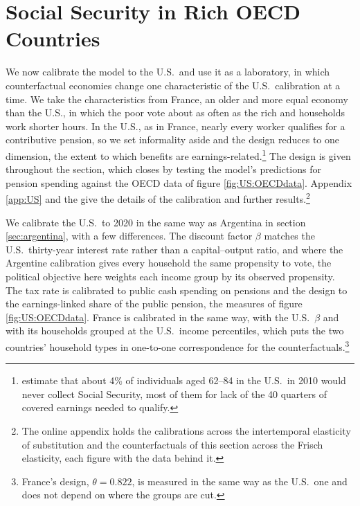 \section{Social Security in Rich OECD Countries}\label{sec:oecd}\label{sec:quant:OECD}
We now calibrate the model to the U.S.\ and use it as a laboratory, in which counterfactual economies change one characteristic of the U.S.\ calibration at a time. We take the characteristics from France, an older and more equal economy than the U.S., in which the poor vote about as often as the rich and households work shorter hours. In the U.S., as in France, nearly every worker qualifies for a contributive pension, so we set informality aside and the design reduces to one dimension, the extent to which benefits are earnings-related.\footnote{\textcite{WhitmanRa1} estimate that about 4\% of individuals aged 62--84 in the U.S.\ in 2010 would never collect Social Security, most of them for lack of the 40 quarters of covered earnings needed to qualify.} The design is given throughout the section, which closes by testing the model's predictions for pension spending against the OECD data of figure \ref{fig:US:OECDdata}. Appendix \ref{app:US} and the  give the details of the calibration and further results.\footnote{The online appendix holds the calibrations across the intertemporal elasticity of substitution and the counterfactuals of this section across the Frisch elasticity, each figure with the data behind it.}


We calibrate the U.S.\ to 2020 in the same way as Argentina in section \ref{sec:argentina}, with a few differences. The discount factor $\beta$ matches the U.S.\ thirty-year interest rate rather than a capital--output ratio, and where the Argentine calibration gives every household the same propensity to vote, the political objective here weights each income group by its observed propensity. The tax rate is calibrated to public cash spending on pensions and the design to the earnings-linked share of the public pension, the measures of figure \ref{fig:US:OECDdata}. France is calibrated in the same way, with the U.S.\ $\beta$ and with its households grouped at the U.S.\ income percentiles, which puts the two countries' household types in one-to-one correspondence for the counterfactuals.\footnote{France's design, $\theta = 0.822$, is measured in the same way as the U.S.\ one and does not depend on where the groups are cut.}

